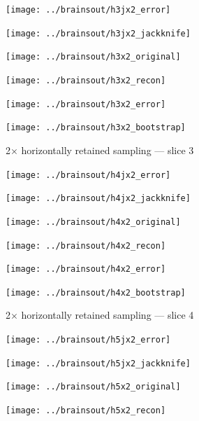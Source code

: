 \documentclass[article]{jdssv}
\begin{document}
\begin{appendix}
\begin{figure}
\begin{centering}
\parbox{\imsize}{\texttt{[image: ../brainsout/h3jx2\_error]}}
\parbox{\imsize}{\texttt{[image: ../brainsout/h3jx2\_jackknife]}}

\vspace{\vertsep}

\parbox{\imsize}{\texttt{[image: ../brainsout/h3x2\_original]}}
\parbox{\imsize}{\texttt{[image: ../brainsout/h3x2\_recon]}}

\vspace{\vertsep}

\parbox{\imsize}{\texttt{[image: ../brainsout/h3x2\_error]}}
\parbox{\imsize}{\texttt{[image: ../brainsout/h3x2\_bootstrap]}}

\end{centering}
\caption{2$\times$ horizontally retained sampling --- slice 3}
\end{figure}


\begin{figure}
\begin{centering}

\parbox{\imsize}{\texttt{[image: ../brainsout/h4jx2\_error]}}
\parbox{\imsize}{\texttt{[image: ../brainsout/h4jx2\_jackknife]}}

\vspace{\vertsep}

\parbox{\imsize}{\texttt{[image: ../brainsout/h4x2\_original]}}
\parbox{\imsize}{\texttt{[image: ../brainsout/h4x2\_recon]}}

\vspace{\vertsep}

\parbox{\imsize}{\texttt{[image: ../brainsout/h4x2\_error]}}
\parbox{\imsize}{\texttt{[image: ../brainsout/h4x2\_bootstrap]}}

\end{centering}
\caption{2$\times$ horizontally retained sampling --- slice 4}
\end{figure}


\begin{figure}
\begin{centering}

\parbox{\imsize}{\texttt{[image: ../brainsout/h5jx2\_error]}}
\parbox{\imsize}{\texttt{[image: ../brainsout/h5jx2\_jackknife]}}

\vspace{\vertsep}

\parbox{\imsize}{\texttt{[image: ../brainsout/h5x2\_original]}}
\parbox{\imsize}{\texttt{[image: ../brainsout/h5x2\_recon]}}

\vspace{\vertsep}


\end{centering}
\end{figure}
\end{appendix}
\end{document}
